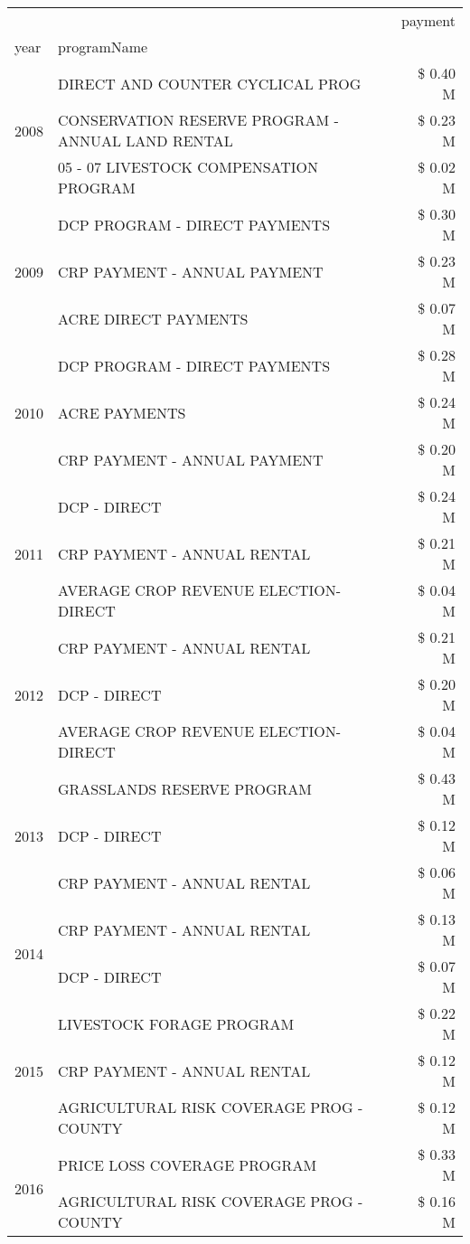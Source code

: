 \begin{tabular}{llr}
\toprule
 &  & payment \\
year & programName &  \\
\midrule
\multirow[t]{3}{*}{2008} & DIRECT AND COUNTER CYCLICAL PROG & \$ 0.40 M \\
 & CONSERVATION RESERVE PROGRAM - ANNUAL LAND RENTAL & \$ 0.23 M \\
 & 05 - 07 LIVESTOCK COMPENSATION PROGRAM & \$ 0.02 M \\
\cline{1-3}
\multirow[t]{3}{*}{2009} & DCP PROGRAM - DIRECT PAYMENTS & \$ 0.30 M \\
 & CRP PAYMENT - ANNUAL PAYMENT & \$ 0.23 M \\
 & ACRE DIRECT PAYMENTS & \$ 0.07 M \\
\cline{1-3}
\multirow[t]{3}{*}{2010} & DCP PROGRAM - DIRECT PAYMENTS & \$ 0.28 M \\
 & ACRE PAYMENTS & \$ 0.24 M \\
 & CRP PAYMENT - ANNUAL PAYMENT & \$ 0.20 M \\
\cline{1-3}
\multirow[t]{3}{*}{2011} & DCP - DIRECT & \$ 0.24 M \\
 & CRP PAYMENT - ANNUAL RENTAL & \$ 0.21 M \\
 & AVERAGE CROP REVENUE ELECTION-DIRECT & \$ 0.04 M \\
\cline{1-3}
\multirow[t]{3}{*}{2012} & CRP PAYMENT - ANNUAL RENTAL & \$ 0.21 M \\
 & DCP - DIRECT & \$ 0.20 M \\
 & AVERAGE CROP REVENUE ELECTION-DIRECT & \$ 0.04 M \\
\cline{1-3}
\multirow[t]{3}{*}{2013} & GRASSLANDS RESERVE PROGRAM & \$ 0.43 M \\
 & DCP - DIRECT & \$ 0.12 M \\
 & CRP PAYMENT - ANNUAL RENTAL & \$ 0.06 M \\
\cline{1-3}
\multirow[t]{2}{*}{2014} & CRP PAYMENT - ANNUAL RENTAL & \$ 0.13 M \\
 & DCP - DIRECT & \$ 0.07 M \\
\cline{1-3}
\multirow[t]{3}{*}{2015} & LIVESTOCK FORAGE PROGRAM & \$ 0.22 M \\
 & CRP PAYMENT - ANNUAL RENTAL & \$ 0.12 M \\
 & AGRICULTURAL RISK COVERAGE PROG - COUNTY & \$ 0.12 M \\
\cline{1-3}
\multirow[t]{3}{*}{2016} & PRICE LOSS COVERAGE PROGRAM                   & \$ 0.33 M \\
 & AGRICULTURAL RISK COVERAGE PROG - COUNTY      & \$ 0.16 M \\

\end{tabular}
